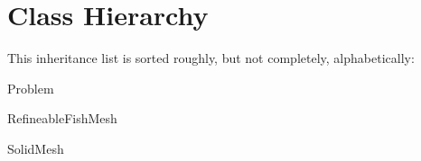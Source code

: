 \section{Class Hierarchy}
This inheritance list is sorted roughly, but not completely, alphabetically\+:\begin{DoxyCompactList}
\item Problem\begin{DoxyCompactList}
\item {}
\end{DoxyCompactList}
\item Refineable\+Fish\+Mesh\begin{DoxyCompactList}
\item {}
\end{DoxyCompactList}
\item Solid\+Mesh\begin{DoxyCompactList}
\item {}
\end{DoxyCompactList}
\end{DoxyCompactList}
